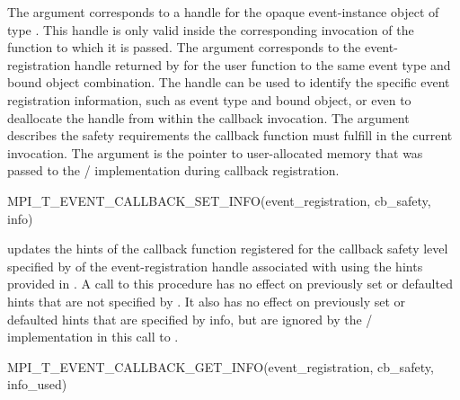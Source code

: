 The argument  corresponds to a handle for the
opaque event-instance object of type 
. 
This handle is only valid inside the
corresponding invocation of the function to which it is passed.  The
argument  corresponds to the event-registration handle
returned by  for the user function to
the same event type and bound object combination.  The handle can be used
to identify the specific event registration information, such as event type
and bound object, or even to deallocate the handle from within the callback
invocation.
The argument  describes the safety requirements the
callback function must fulfill in the current invocation.  The argument
 is the pointer to user-allocated memory that was
passed to the \MPI/ implementation during callback registration.

\begin{funcdef}{MPI\_T\_EVENT\_CALLBACK\_SET\_INFO}{(\mbox{event\_registration}, \mbox{cb\_safety}, \mbox{info})}
\end{funcdef}

 updates the hints of the
callback function registered for the callback safety level specified by
 of the event-registration handle associated with
 using the hints provided in .
A call to this procedure has no effect on previously set or defaulted hints that are
not specified by . It also has no effect on previously set or
defaulted hints that are specified by info, but are ignored by the \MPI/
implementation in this call to
.

\begin{funcdef}{MPI\_T\_EVENT\_CALLBACK\_GET\_INFO}{(\mbox{event\_registration}, \mbox{cb\_safety}, \mbox{info\_used})}
\end{funcdef}


